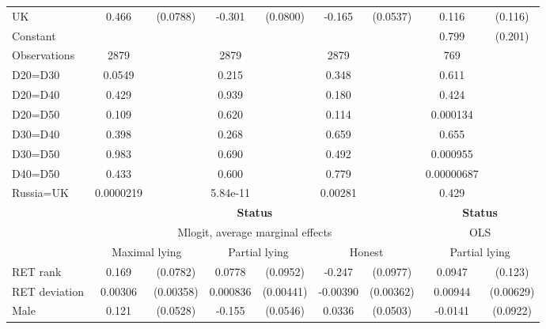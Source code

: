 \begin{tabular}{l|cccccc|cc}
UK            &    0.466\sym{***}& (0.0788)&   -0.301\sym{***}& (0.0800)&   -0.165\sym{***}& (0.0537)&    0.116         &  (0.116)\\
Constant        &                  &         &                  &         &                  &         &    0.799\sym{***}&  (0.201)\\
\hline
Observations    &     2879         &         &     2879         &         &     2879         &         &      769         &         \\
D20=D30         &   0.0549         &         &    0.215         &         &    0.348         &         &    0.611         &         \\
D20=D40         &    0.429         &         &    0.939         &         &    0.180         &         &    0.424         &         \\
D20=D50         &    0.109         &         &    0.620         &         &    0.114         &         & 0.000134         &         \\
D30=D40         &    0.398         &         &    0.268         &         &    0.659         &         &    0.655         &         \\
D30=D50         &    0.983         &         &    0.690         &         &    0.492         &         & 0.000955         &         \\
D40=D50         &    0.433         &         &    0.600         &         &    0.779         &         &0.00000687         &         \\
Russia=UK       &0.0000219         &         & 5.84e-11         &         &  0.00281         &         &    0.429         &         \\
\hline\hline
&\multicolumn{6}{c|}{\bf Status}&\multicolumn{2}{c}{\bf Status}\\ &\multicolumn{6}{c|}{Mlogit, average marginal effects }&\multicolumn{2}{c}{OLS}\\
                &\multicolumn{2}{c}{Maximal lying}&\multicolumn{2}{c}{Partial lying}&\multicolumn{2}{c|}{Honest}  &\multicolumn{2}{c}{Partial lying}\\
\hline
RET rank        &    0.169\sym{**} & (0.0782)&   0.0778         & (0.0952)&   -0.247\sym{**} & (0.0977)&   0.0947         &  (0.123)\\
RET deviation   &  0.00306         &(0.00358)& 0.000836         &(0.00441)& -0.00390         &(0.00362)&  0.00944         &(0.00629)\\
Male            &    0.121\sym{**} & (0.0528)&   -0.155\sym{***}& (0.0546)&   0.0336         & (0.0503)&  -0.0141         & (0.0922)\\

\end{tabular}
